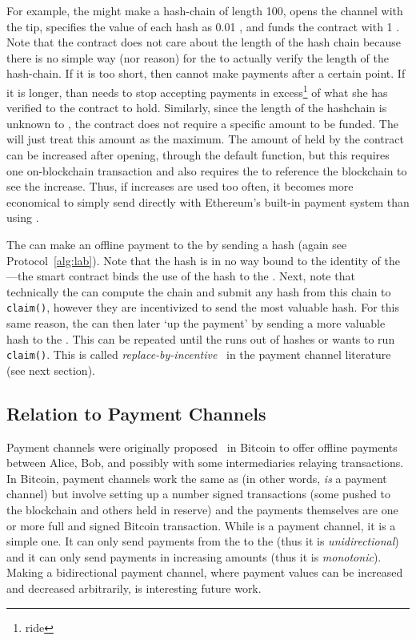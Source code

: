 For example, the \make might make a hash-chain of length 100, opens the channel with the tip, specifies the value of each hash as 0.01 \eth, and funds the contract with 1 \eth. Note that the contract does not care about the length of the hash chain because there is no simple way (nor reason) for the \take to actually verify the length of the hash-chain. If it is too short, then \make cannot make payments after a certain point. If it is longer, than \take needs to stop accepting payments in excess\footnote{ride} of what she has verified to the contract to hold. Similarly, since the length of the hashchain is unknown to \take, the contract does not require a specific amount to be funded. The \take will just treat this amount as the maximum. The amount of \eth held by the contract can be increased after opening, through the default function, but this requires one on-blockchain transaction and also requires the \take to reference the blockchain to see the increase. Thus, if increases are used too often, it becomes more economical to simply send \eth directly with Ethereum's built-in payment system than using \ew.

The \make can make an offline payment to the \take by sending a hash (again see Protocol~\ref{alg:lab}). Note that the hash is in no way bound to the identity of the \take---the smart contract binds the use of the hash to the \take. Next, note that technically the \take can compute the chain and submit any hash from this chain to \texttt{claim()}, however they are incentivized to send the most valuable hash. For this same reason, the \make can then later `up the payment' by sending a more valuable hash to the \take. This can be repeated until the \make runs out of hashes or \take wants to run \texttt{claim()}. This is called \textit{replace-by-incentive}~\cite{MMSH16} in the payment channel literature (see next section).

\subsection{Relation to Payment Channels}
\label{sec:pcn}

Payment channels were originally proposed~\cite{DW15,PD15} in Bitcoin to offer offline payments between Alice, Bob, and possibly with some intermediaries relaying transactions. In Bitcoin, payment channels work the same as \ew (in other words, \ew \textit{is} a payment channel) but involve setting up a number signed transactions (some pushed to the blockchain and others held in reserve) and the payments themselves are one or more full and signed Bitcoin transaction. While \ew is a payment channel, it is a simple one. It can only send payments from the \make to the \take (thus it is \textit{unidirectional}) and it can only send payments in increasing amounts (thus it is \textit{monotonic}). Making a bidirectional payment channel, where payment values can be increased and decreased arbitrarily, is interesting future work.

